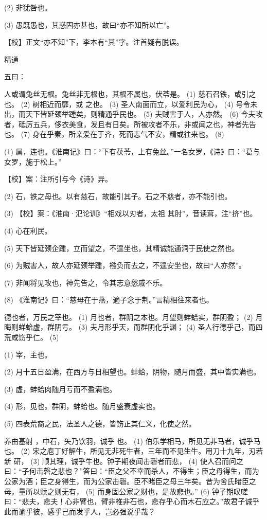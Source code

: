 \documentclass[12pt,UTF8]{ctexbook}
\begin{document}
(2) 非犹咎也。

(3) 愚既愚也，其惑固亦甚也，故曰“亦不知所以亡”。

【校】正文“亦不知”下，李本有“其”字。注首疑有脱误。





精通


五曰：

人或谓兔丝无根。兔丝非无根也，其根不属也，伏苓是。 (1) 慈石召铁，或引之也。 (2) 树相近而靡，或 之也。 (3) 圣人南面而立，以爱利民为心， (4) 号令未出，而天下皆延颈举踵矣，则精通乎民也。 (5) 夫贼害于人，人亦然。 (6) 今夫攻者，砥厉五兵，侈衣美食，发且有日矣。所被攻者不乐，非或闻之也，神者先告也。 (7) 身在乎秦，所亲爱在于齐，死而志气不安，精或往来也。 (8)

(1) 属，连也。《淮南记》曰：“下有茯苓，上有兔丝。”一名女罗，《诗》曰：“葛与女罗，施于松上。”

【校】案：注所引与今《诗》异。

(2) 石，铁之母也。以有慈石，故能引其子。石之不慈者，亦不能引也。

(3) 【校】案：《淮南·氾论训》“相戏以刃者，太祖 其肘”，音读茸，注“挤”也。

(4) 心在利民。

(5) 天下皆延颈企踵，立而望之，不遑坐也，其精诚能通洞于民使之然也。

(6) 为贼害人，故人亦延颈举踵，襁负而去之，不遑安坐也，故曰“人亦然”。

(7) 非闻将见攻也，神先告之，令其志意愁戚不乐。

(8) 《淮南记》曰：“慈母在于燕，適子念于荆。”言精相往来者也。

德也者，万民之宰也。 (1) 月也者，群阴之本也。月望则蚌蛤实，群阴盈； (2) 月晦则蛘蛤虚，群阴亏。 (3) 夫月形乎天，而群阴化乎渊； (4) 圣人行德乎己，而四荒咸饬乎仁。 (5)

(1) 宰，主也。

(2) 月十五日盈满，在西方与日相望也。蚌蛤，阴物，随月而盛，其中皆实满也。

(3) 虚，蚌蛤肉随月亏而不盈满也。

(4) 形，见也。群阴，蚌蛤也。随月盛衰虚实也。

(5) 四表荒裔之民，法圣人之德，皆饬正其仁义，化使之然。

养由基射 ，中石，矢乃饮羽，诚乎 也。 (1) 伯乐学相马，所见无非马者，诚乎马也。 (2) 宋之庖丁好解牛，所见无非死牛者，三年而不见生牛。用刀十九年，刃若新 研， (3) 顺其理，诚乎牛也。钟子期夜闻击磬者而悲， (4) 使人召而问之曰：“子何击磬之悲也？”答曰：“臣之父不幸而杀人，不得生；臣之母得生，而为公家为酒；臣之身得生，而为公家击磬。臣不睹臣之母三年矣。昔为舍氏睹臣之母，量所以赎之则无有， (5) 而身固公家之财也，是故悲也。” (6) 钟子期叹嗟曰：“悲夫，悲夫！心非臂也，臂非椎非石也，悲存乎心而木石应之。”故君子诚乎此而谕乎彼，感乎己而发乎人，岂必强说乎哉？
\end{document}
